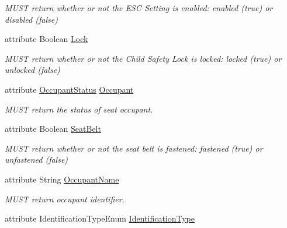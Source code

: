 \begin{DoxyCompactItemize}
\begin{DoxyCompactList}\small\item\em M\+U\+S\+T return whether or not the E\+S\+C Setting is enabled\+: enabled (true) or disabled (false) \end{DoxyCompactList}\item 
\hypertarget{interfaceVehiclePropertyType_a7361c79cf1c48bcb81f03e946e598328}{attribute Boolean \hyperlink{interfaceVehiclePropertyType_a7361c79cf1c48bcb81f03e946e598328}{Lock}}\label{interfaceVehiclePropertyType_a7361c79cf1c48bcb81f03e946e598328}

\begin{DoxyCompactList}\small\item\em M\+U\+S\+T return whether or not the Child Safety Lock is locked\+: locked (true) or unlocked (false) \end{DoxyCompactList}\item 
\hypertarget{interfaceVehiclePropertyType_a15f0d0b367ab9aa60f69eb03fb6352ab}{attribute \hyperlink{interfaceOccupantStatus}{Occupant\+Status} \hyperlink{interfaceVehiclePropertyType_a15f0d0b367ab9aa60f69eb03fb6352ab}{Occupant}}\label{interfaceVehiclePropertyType_a15f0d0b367ab9aa60f69eb03fb6352ab}

\begin{DoxyCompactList}\small\item\em M\+U\+S\+T return the status of seat occupant. \end{DoxyCompactList}\item 
\hypertarget{interfaceVehiclePropertyType_a5572d9df193da429b92a8062ab616db6}{attribute Boolean \hyperlink{interfaceVehiclePropertyType_a5572d9df193da429b92a8062ab616db6}{Seat\+Belt}}\label{interfaceVehiclePropertyType_a5572d9df193da429b92a8062ab616db6}

\begin{DoxyCompactList}\small\item\em M\+U\+S\+T return whether or not the seat belt is fastened\+: fastened (true) or unfastened (false) \end{DoxyCompactList}\item 
\hypertarget{interfaceVehiclePropertyType_ad84e4a4284f47ee59d19b162b3eb1d2f}{attribute String \hyperlink{interfaceVehiclePropertyType_ad84e4a4284f47ee59d19b162b3eb1d2f}{Occupant\+Name}}\label{interfaceVehiclePropertyType_ad84e4a4284f47ee59d19b162b3eb1d2f}

\begin{DoxyCompactList}\small\item\em M\+U\+S\+T return occupant identifier. \end{DoxyCompactList}\item 
\hypertarget{interfaceVehiclePropertyType_a4ec657559470562608b83276f480e045}{attribute Identification\+Type\+Enum \hyperlink{interfaceVehiclePropertyType_a4ec657559470562608b83276f480e045}{Identification\+Type}}\label{interfaceVehiclePropertyType_a4ec657559470562608b83276f480e045}


\end{DoxyCompactItemize}
